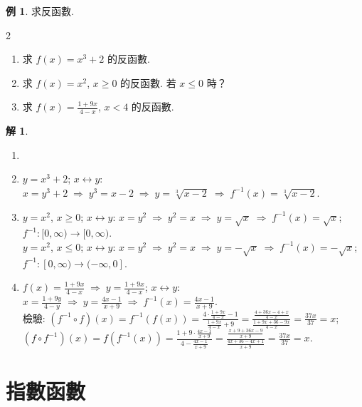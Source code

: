 \documentclass[12pt]{extarticle}
\newcommand{\ds}{\displaystyle}
\newcommand{\ie}{\;\Longrightarrow\;}
\theoremstyle{definition}
\newtheorem*{ex}{例}
\newtheorem*{sol}{解}
\begin{document}
\begin{ex} 求反函數. 
  \setlength{\columnsep}{-0mm}
  \begin{multicols}{2}
    \begin{enumerate}\setlength\itemsep{0em}
      \item 求 $f(x) = x^3 + 2$ 的反函數. 
      \item 求 $f(x) = x^2$, $x\geqslant 0$ 的反函數. 若 $x\leqslant 0$ 時？
      \item 求 $\ds f(x) = \frac{1 + 9 x}{4 - x}$, $x < 4$ 的反函數. 
    \end{enumerate}
  \end{multicols}
\end{ex}

\begin{sol} 
  \begin{enumerate}\setlength\itemsep{0em}
    \item[]
    \item $y = x^3 + 2$; $x\longleftrightarrow y$: $x = y^3 + 2 \ie y^3 = x - 2 \ie y = \sqrt[3]{x - 2} \ie f^{-1}(x) = \sqrt[3]{x - 2}$.  
    \item $y = x^2$, $x\geqslant 0$;  $x\longleftrightarrow y$: $x = y^2 \ie y^2 = x \ie y = \sqrt{x} \ie f^{-1}(x) = \sqrt{x}$; $f^{-1}:[0, \infty)\to [0, \infty)$. \\$y = x^2$, $x\leqslant 0$;  $x\longleftrightarrow y$: $x = y^2 \ie y^2 = x \ie y = -\sqrt{x} \ie f^{-1}(x) = -\sqrt{x}$; $f^{-1}:[0, \infty)\to (-\infty, 0]$. 
    \item $\ds f(x) = \frac{1 + 9x}{4 - x} \ie y = \frac{1 + 9x}{4 - x}$; $x\longleftrightarrow y$: $\ds x = \frac{1 + 9 y}{4 - y} \ie y = \frac{4 x - 1}{x + 9} \ie f^{-1}(x) = \frac{4 x - 1}{x + 9}$. \\
      檢驗: $\ds (f^{-1}\circ f)(x) = f^{-1}(f(x)) = \frac{4\cdot\frac{1 + 9x}{4 - x} - 1}{\frac{1 + 9x}{4 - x} + 9} = \frac{\frac{4 + 36 x - 4 + x}{4 - x}}{\frac{1 + 9x + 36 - 9x}{4 - x}} = \frac{37 x}{37} = x$; $\ds(f\circ f^{-1})(x) = f(f^{-1}(x)) = \frac{1 + 9\cdot\frac{4x - 1}{x + 9}}{4 - \frac{4 x - 1}{x + 9}} = \frac{\frac{x + 9 + 36 x - 9}{x + 9}}{\frac{4 x + 36 - 4x + 1}{x + 9}} = \frac{37x}{37} = x$. 
  \end{enumerate}
\end{sol}

\section*{指數函數}
\end{document}

